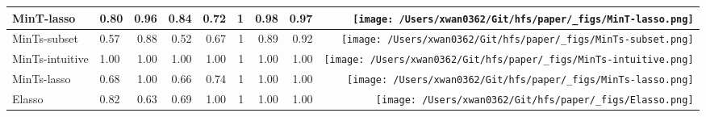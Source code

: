 \documentclass[11pt,a4paper,]{article}
\begin{document}
\begin{table}[!h]
{\begin{tabular}{llrrrrrr>{}r}
MinT-lasso & 0.80 & 0.96 & 0.84 & 0.72 & 1 & 0.98 & 0.97 & \texttt{[image: /Users/xwan0362/Git/hfs/paper/\_figs/MinT-lasso.png]}\\
\midrule
MinTs-subset & 0.57 & 0.88 & 0.52 & 0.67 & 1 & 0.89 & 0.92 & \texttt{[image: /Users/xwan0362/Git/hfs/paper/\_figs/MinTs-subset.png]}\\
MinTs-intuitive & 1.00 & 1.00 & 1.00 & 1.00 & 1 & 1.00 & 1.00 & \texttt{[image: /Users/xwan0362/Git/hfs/paper/\_figs/MinTs-intuitive.png]}\\
MinTs-lasso & 0.68 & 1.00 & 0.66 & 0.74 & 1 & 1.00 & 1.00 & \texttt{[image: /Users/xwan0362/Git/hfs/paper/\_figs/MinTs-lasso.png]}\\
\midrule
Elasso & 0.82 & 0.63 & 0.69 & 1.00 & 1 & 1.00 & 1.00 & \texttt{[image: /Users/xwan0362/Git/hfs/paper/\_figs/Elasso.png]}\\
\bottomrule
\end{tabular}}
\end{table}
\end{document}
